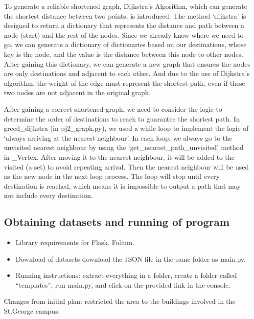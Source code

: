 \documentclass[12pt]{article}
\begin{document}
	To generate a reliable shortened graph, Dijkstra’s Algorithm, which can generate the shortest distance between two points, is introduced. The method ‘dijkstra’ is designed to return a dictionary that represents the distance and path between a node (start) and the rest of the nodes. Since we already know where we need to go, we can generate a dictionary of dictionaries based on our destinations, whose key is the node, and the value is the distance between this node to other nodes. After gaining this dictionary, we can generate a new graph that ensures the nodes are only destinations and adjacent to each other. And due to the use of Dijkstra’s algorithm, the weight of the edge must represent the shortest path, even if these two nodes are not adjacent in the original graph.
	
	After gaining a correct shortened graph, we need to consider the logic to determine the order of destinations to reach to guarantee the shortest path. In greed\_dijkstra (in pj2\_graph.py), we used a while loop to implement the logic of ‘always arriving at the nearest neighbour’. In each loop, we always go to the unvisited nearest neighbour by using the ‘get\_nearest\_path\_unvisited’ method in \_Vertex. After moving it to the nearest neighbour, it will be added to the visited (a set) to avoid repeating arrival. Then the nearest neighbour will be used as the new node in the next loop process. The loop will stop until every destination is reached, which means it is impossible to output a path that may not include every destination.
	
	\subsection*{Obtaining datasets and running of program}
	\begin{itemize}
		\item Library requirements for Flask. Folium.
		\item Download of datasets download the JSON file in the same folder as main.py.
		\item Running instructions: extract everything in a folder, create a folder called “templates”, run main.py, and click on the provided link in the console.
	\end{itemize}
	Changes from initial plan: restricted the area to the buildings involved in the St.George campus.
	
\end{document}
